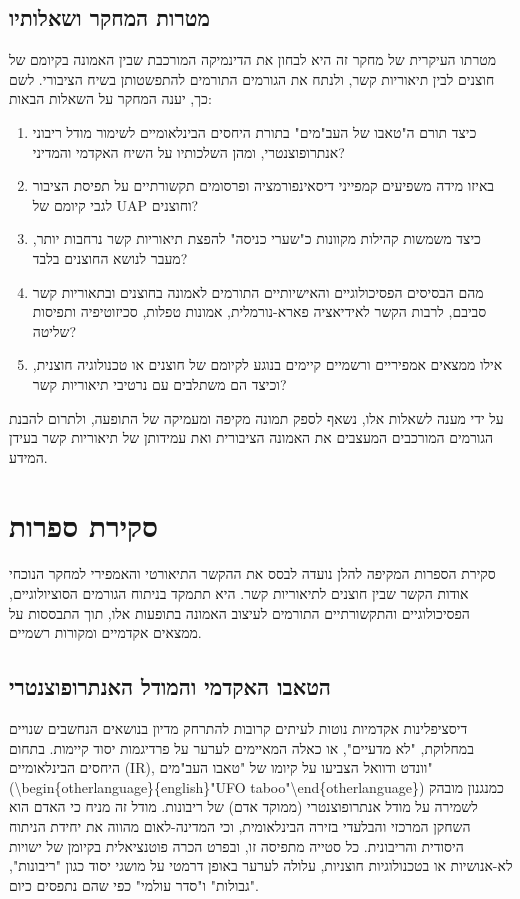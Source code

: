\documentclass[12pt,a4paper]{article}
\begin{document}
\subsection{מטרות המחקר ושאלותיו}
מטרתו העיקרית של מחקר זה היא לבחון את הדינמיקה המורכבת שבין האמונה בקיומם של חוצנים לבין תיאוריות קשר, ולנתח את הגורמים התורמים להתפשטותן בשיח הציבורי. לשם כך, יענה המחקר על השאלות הבאות:
\begin{enumerate}
    \item כיצד תורם ה"טאבו של העב"מים" בתורת היחסים הבינלאומיים לשימור מודל ריבוני אנתרופוצנטרי, ומהן השלכותיו על השיח האקדמי והמדיני?
    \item באיזו מידה משפיעים קמפייני דיסאינפורמציה ופרסומים תקשורתיים על תפיסת הציבור לגבי קיומם של UAP וחוצנים?
    \item כיצד משמשות קהילות מקוונות כ"שערי כניסה" להפצת תיאוריות קשר נרחבות יותר, מעבר לנושא החוצנים בלבד?
    \item מהם הבסיסים הפסיכולוגיים והאישיותיים התורמים לאמונה בחוצנים ובתאוריות קשר סביבם, לרבות הקשר לאידיאציה פארא-נורמלית, אמונות טפלות, סכיזוטיפיה ותפיסות שליטה?
    \item אילו ממצאים אמפיריים ורשמיים קיימים בנוגע לקיומם של חוצנים או טכנולוגיה חוצנית, וכיצד הם משתלבים עם נרטיבי תיאוריות קשר?
\end{enumerate}
על ידי מענה לשאלות אלו, נשאף לספק תמונה מקיפה ומעמיקה של התופעה, ולתרום להבנת הגורמים המורכבים המעצבים את האמונה הציבורית ואת עמידותן של תיאוריות קשר בעידן המידע.

\section{סקירת ספרות}

סקירת הספרות המקיפה להלן נועדה לבסס את ההקשר התיאורטי והאמפירי למחקר הנוכחי אודות הקשר שבין חוצנים לתיאוריות קשר. היא תתמקד בניתוח הגורמים הסוציולוגיים, הפסיכולוגיים והתקשורתיים התורמים לעיצוב האמונה בתופעות אלו, תוך התבססות על ממצאים אקדמיים ומקורות רשמיים.

\subsection{הטאבו האקדמי והמודל האנתרופוצנטרי}
דיסציפלינות אקדמיות נוטות לעיתים קרובות להתרחק מדיון בנושאים הנחשבים שנויים במחלוקת, "לא מדעיים", או כאלה המאיימים לערער על פרדיגמות יסוד קיימות. בתחום היחסים הבינלאומיים (IR), וונדט ודוואל \cite{Wendt2008} הצביעו על קיומו של "טאבו העב"מים" (\textbackslash{}begin\{otherlanguage\}\{english\}"UFO taboo"\textbackslash{}end\{otherlanguage\}) כמנגנון מובהק לשמירה על מודל אנתרופוצנטרי (ממוקד אדם) של ריבונות. מודל זה מניח כי האדם הוא השחקן המרכזי והבלעדי בזירה הבינלאומית, וכי המדינה-לאום מהווה את יחידת הניתוח היסודית והריבונית. כל סטייה מתפיסה זו, ובפרט הכרה פוטנציאלית בקיומן של ישויות לא-אנושיות או בטכנולוגיות חוצניות, עלולה לערער באופן דרמטי על מושגי יסוד כגון "ריבונות", "גבולות" ו"סדר עולמי" כפי שהם נתפסים כיום.
\end{document}
